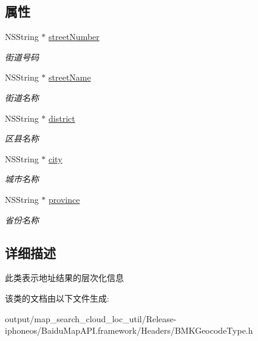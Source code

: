 \subsection*{属性}
\begin{DoxyCompactItemize}
\item 
\hypertarget{interface_b_m_k_address_component_a7a9e0a709b4969472aa1b17a042975c8}{}N\+S\+String $\ast$ \hyperlink{interface_b_m_k_address_component_a7a9e0a709b4969472aa1b17a042975c8}{street\+Number}\label{interface_b_m_k_address_component_a7a9e0a709b4969472aa1b17a042975c8}

\begin{DoxyCompactList}\small\item\em 街道号码 \end{DoxyCompactList}\item 
\hypertarget{interface_b_m_k_address_component_afef3697cbdab210a40b85a4d628aa6b8}{}N\+S\+String $\ast$ \hyperlink{interface_b_m_k_address_component_afef3697cbdab210a40b85a4d628aa6b8}{street\+Name}\label{interface_b_m_k_address_component_afef3697cbdab210a40b85a4d628aa6b8}

\begin{DoxyCompactList}\small\item\em 街道名称 \end{DoxyCompactList}\item 
\hypertarget{interface_b_m_k_address_component_a3bb4c8b38bef483378a4ed4e0ec33aaa}{}N\+S\+String $\ast$ \hyperlink{interface_b_m_k_address_component_a3bb4c8b38bef483378a4ed4e0ec33aaa}{district}\label{interface_b_m_k_address_component_a3bb4c8b38bef483378a4ed4e0ec33aaa}

\begin{DoxyCompactList}\small\item\em 区县名称 \end{DoxyCompactList}\item 
\hypertarget{interface_b_m_k_address_component_ad7a30c029e65d37d09d106ca5cb55d1b}{}N\+S\+String $\ast$ \hyperlink{interface_b_m_k_address_component_ad7a30c029e65d37d09d106ca5cb55d1b}{city}\label{interface_b_m_k_address_component_ad7a30c029e65d37d09d106ca5cb55d1b}

\begin{DoxyCompactList}\small\item\em 城市名称 \end{DoxyCompactList}\item 
\hypertarget{interface_b_m_k_address_component_a849d581c8eaa3447b9aaa1764f7ac85c}{}N\+S\+String $\ast$ \hyperlink{interface_b_m_k_address_component_a849d581c8eaa3447b9aaa1764f7ac85c}{province}\label{interface_b_m_k_address_component_a849d581c8eaa3447b9aaa1764f7ac85c}

\begin{DoxyCompactList}\small\item\em 省份名称 \end{DoxyCompactList}\end{DoxyCompactItemize}


\subsection{详细描述}
此类表示地址结果的层次化信息 

该类的文档由以下文件生成\+:\begin{DoxyCompactItemize}
\item 
output/map\+\_\+search\+\_\+cloud\+\_\+loc\+\_\+util/\+Release-\/iphoneos/\+Baidu\+Map\+A\+P\+I.\+framework/\+Headers/B\+M\+K\+Geocode\+Type.\+h\end{DoxyCompactItemize}
